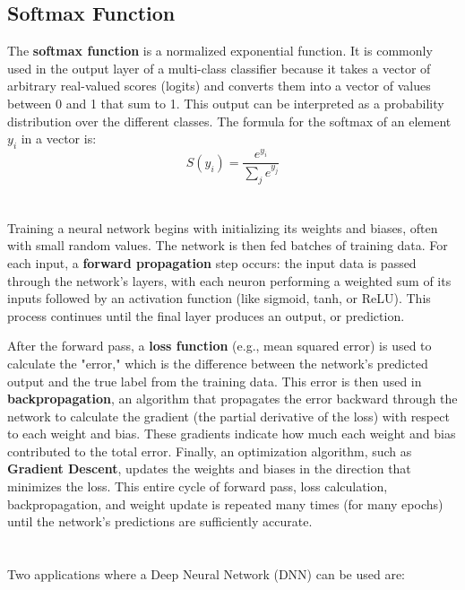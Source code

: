 \documentclass[a4paper,12pt]{article}
\begin{document}
\subsection{Softmax Function}
The \textbf{softmax function} is a normalized exponential function. It is commonly used in the output layer of a multi-class classifier because it takes a vector of arbitrary real-valued scores (logits) and converts them into a vector of values between 0 and 1 that sum to 1. This output can be interpreted as a probability distribution over the different classes. The formula for the softmax of an element $y_i$ in a vector is:
$$
S(y_i) = \frac{e^{y_i}}{\sum_j e^{y_j}}
$$


\section{}

Training a neural network begins with initializing its weights and biases, often with small random values. The network is then fed batches of training data. For each input, a \textbf{forward propagation} step occurs: the input data is passed through the network's layers, with each neuron performing a weighted sum of its inputs followed by an activation function (like sigmoid, tanh, or ReLU). This process continues until the final layer produces an output, or prediction.

After the forward pass, a \textbf{loss function} (e.g., mean squared error) is used to calculate the "error," which is the difference between the network's predicted output and the true label from the training data. This error is then used in \textbf{backpropagation}, an algorithm that propagates the error backward through the network to calculate the gradient (the partial derivative of the loss) with respect to each weight and bias. These gradients indicate how much each weight and bias contributed to the total error. Finally, an optimization algorithm, such as \textbf{Gradient Descent}, updates the weights and biases in the direction that minimizes the loss. This entire cycle of forward pass, loss calculation, backpropagation, and weight update is repeated many times (for many epochs) until the network's predictions are sufficiently accurate.

\section{}

Two applications where a Deep Neural Network (DNN) can be used are:
\end{document}
